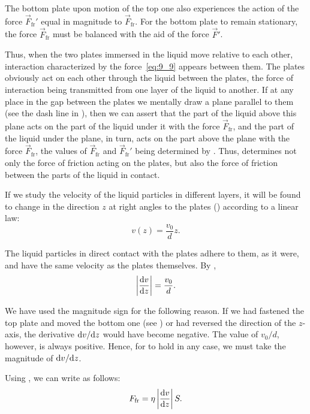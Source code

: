 The bottom plate upon motion of the top one also experiences the action of the force $\vec{F}_{\text{fr}}'$ equal in magnitude to $\vec{F}_{\text{fr}}$. For the bottom plate to remain stationary, the force $\vec{F}_{\text{fr}}$ must be balanced with the aid of the force $\vec{F}'$.

Thus, when the two plates immersed in the liquid move relative to each other, interaction characterized by the force~\eqref{eq:9_9} appears between them. The plates obviously act on each other through the liquid between the plates, the force of interaction being transmitted from one layer of the liquid to another. If at any place in the gap between the plates we mentally draw a plane parallel to them (see the dash line in ), then we can assert that the part of the liquid above this plane acts on the part of the liquid under it with the force $\vec{F}_{\text{fr}}$, and the part of the liquid under the plane, in turn, acts on the part above the plane with the force $\vec{F}_{\text{fr}}$, the values of $\vec{F}_{\text{fr}}$ and $\vec{F}_{\text{fr}}'$ being determined by . Thus,  determines not only the force of friction acting on the plates, but also the force of friction between the parts of the liquid in contact.

If we study the velocity of the liquid particles in different layers, it will be found to change in the direction $z$ at right angles to the plates () according to a linear law:
\begin{equation}\label{eq:9_10}
	v(z) = \frac{v_0}{d}z.
\end{equation}

\noindent
The liquid particles in direct contact with the plates adhere to them, as it were, and have the same velocity as the plates themselves. By ,
\begin{equation}\label{eq:9_11}
	\left|\frac{\mathrm{d} v}{\mathrm{d} z}\right| = \frac{v_0}{d}.
\end{equation}

\noindent
We have used the magnitude sign for the following reason. If we had fastened the top plate and moved the bottom one (see ) or had reversed the direction of the $z$-axis, the derivative $\mathrm{d} v/\mathrm{d} z$ would have become negative. The value of $v_0/d$, however, is always positive. Hence, for  to hold in any case, we must take the magnitude of $\mathrm{d} v/\mathrm{d} z$.

Using , we can write  as follows:
\begin{equation}\label{eq:9_12}
	F_{\text{fr}} = \eta \left|\frac{\mathrm{d} v}{\mathrm{d} z}\right| S.
\end{equation}

